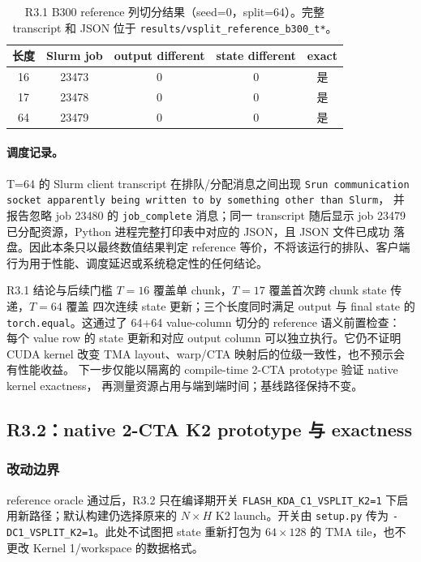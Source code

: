 \documentclass[11pt,a4paper,fontset=none]{ctexart}
\newcommand{\code}[1]{\texttt{#1}}
\begin{document}
\begin{table}[htbp]
\centering
\small
\begin{tabular}{c c c c c}
\toprule
长度 & Slurm job & output different & state different & exact \\
\midrule
16 & 23473 & 0 & 0 & 是 \\
17 & 23478 & 0 & 0 & 是 \\
64 & 23479 & 0 & 0 & 是 \\
\bottomrule
\end{tabular}
\caption{R3.1 B300 reference 列切分结果（seed=0，split=64）。完整 transcript
和 JSON 位于 \code{results/vsplit\_reference\_b300\_t*}。}
\end{table}

\paragraph{调度记录。}T=64 的 Slurm client transcript 在排队/分配消息之间出现
\code{Srun communication socket apparently being written to by something other than Slurm}，
并报告忽略 job 23480 的 \code{job\_complete} 消息；同一 transcript 随后显示
job 23479 已分配资源，Python 进程完整打印表中对应的 JSON，且 JSON 文件已成功
落盘。因此本条只以最终数值结果判定 reference 等价，不将该运行的排队、客户端
行为用于性能、调度延迟或系统稳定性的任何结论。

\begin{record}{R3.1 结论与后续门槛}
\(T=16\) 覆盖单 chunk，\(T=17\) 覆盖首次跨 chunk state 传递，\(T=64\) 覆盖
四次连续 state 更新；三个长度同时满足 output 与 final state 的
\code{torch.equal}。这通过了 64+64 value-column 切分的 reference 语义前置检查：
每个 value row 的 state 更新和对应 output column 可以独立执行。它仍不证明
CUDA kernel 改变 TMA layout、warp/CTA 映射后的位级一致性，也不预示会有性能收益。
下一步仅能以隔离的 compile-time 2-CTA prototype 验证 native kernel exactness，
再测量资源占用与端到端时间；基线路径保持不变。
\end{record}

\subsection{R3.2：native 2-CTA K2 prototype 与 exactness}

\subsubsection{改动边界}

reference oracle 通过后，R3.2 只在编译期开关
\code{FLASH\_KDA\_C1\_VSPLIT\_K2=1} 下启用新路径；默认构建仍选择原来的
\(N\times H\) K2 launch。开关由 \code{setup.py} 传为
\code{-DC1\_VSPLIT\_K2=1}。此处不试图把 state 重新打包为 \(64\times128\)
的 TMA tile，也不更改 Kernel 1/workspace 的数据格式。
\end{document}
